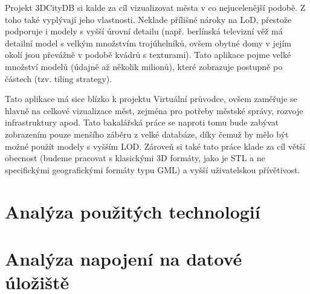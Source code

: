 \documentclass[thesis=B,czech]{FITthesis}[2012/06/26]
\begin{document}
Projekt 3DCityDB si kalde za cíl vizualizovat města v co nejucelenější podobě. Z toho také vyplývají jeho vlastnosti. Neklade přílišné nároky na LoD, přestože podporuje i modely s vyšší úrovní detailu (např. berlínská televizní věž má detailní model s velkým množstvím trojúhelníků, ovšem obytné domy v jejím okolí jsou převážně v podobě kvádrů s texturami). Tato aplikace pojme velké množství modelů (údajně až několik milionů), které zobrazuje postupně po částech (tzv. tiling strategy).

Tato aplikace má sice blízko k projektu Virtuální průvodce, ovšem zaměřuje se hlavně na celkové vizualizace měst, zejména pro potřeby městské správy, rozvoje infrastruktury apod. Tato bakalářská práce se naproti tomu bude zabývat zobrazením pouze menšího záběru z velké databáze, díky čemuž by mělo být možné použít modely s vyšším LOD. Zároveň si také tato práce klade za cíl větší obecnost (budeme pracovat s klasickými 3D formáty, jako je STL a ne specifickými geografickými formáty typu GML) a vyšší uživatelskou přívětivost.


	
	\section{Analýza použitých technologií}
	\section{Analýza napojení na datové úložiště}
\end{document}
